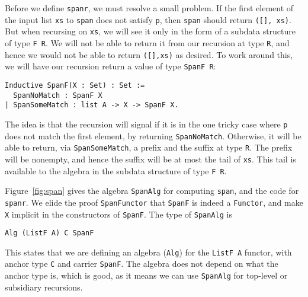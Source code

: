 \documentclass[a4paper,USenglish]{lipics-v2021}
\begin{document}
Before we define \verb|spanr|, we must resolve a small problem.
If the first element of the input list
\verb|xs| to \verb|span| does not satisfy \verb|p|, then \verb|span|
should return \verb|([], xs)|.  But when recursing on \verb|xs|, we
will see it only in the form of a subdata structure of type
\verb|F R|.  We will not be able to return it from our recursion at
type \verb|R|, and hence we would not be able to return \verb|([],xs)|
as desired.  To work around this, we will have our recursion return a value
of type \verb|SpanF R|:
\begin{verbatim}
Inductive SpanF(X : Set) : Set :=
  SpanNoMatch : SpanF X
| SpanSomeMatch : list A -> X -> SpanF X.
\end{verbatim}
\noindent The idea is that the recursion will signal if it is in the
one tricky case where \verb|p| does not match the first element, by
returning \verb|SpanNoMatch|.  Otherwise, it will be able to return,
via \verb|SpanSomeMatch|, a prefix and the suffix at type
\verb|R|. The prefix will be nonempty, and hence the suffix will be at
most the tail of \verb|xs|.  This tail is available to the algebra
in the subdata structure of type \verb|F R|.

Figure~\ref{fig:span} gives the algebra \verb|SpanAlg| for computing
\verb|span|, and the code for \verb|spanr|.  We elide the proof
\verb|SpanFunctor| that \verb|SpanF| is indeed a \verb|Functor|,
and make \verb|X| implicit in the constructors of \verb|SpanF|.
The type of \verb|SpanAlg| is
\begin{verbatim}
Alg (ListF A) C SpanF
\end{verbatim}
This states that we are defining an algebra (\verb|Alg|)
for the \verb|ListF A| functor, with anchor type \verb|C| and carrier
\verb|SpanF|.  The algebra does not depend on what the anchor type is,
which is good, as it means we can use \verb|SpanAlg| for top-level or
subsidiary recursions.
\end{document}
